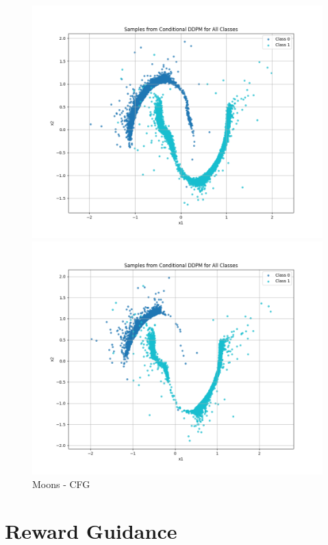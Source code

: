 \documentclass[a4paper,12pt]{article}
\begin{document}
\begin{figure}[H]
  \begin{minipage}{0.3\textwidth}
      \centering
      \includegraphics[width=\linewidth]{"images/Samples - CFG for cond_ddpm_2_50_0.0001_0.02_moons_2.0_sigmoid.png"}
  \end{minipage}
  \begin{minipage}{0.3\textwidth}
      \centering
      \includegraphics[width=\linewidth]{"images/Samples - CFG for cond_ddpm_2_50_0.0001_0.02_moons_4.0_sigmoid.png"}
  \end{minipage}

  \caption{Moons - CFG}
\end{figure}

\clearpage
\section*{Reward Guidance}
\end{document}
